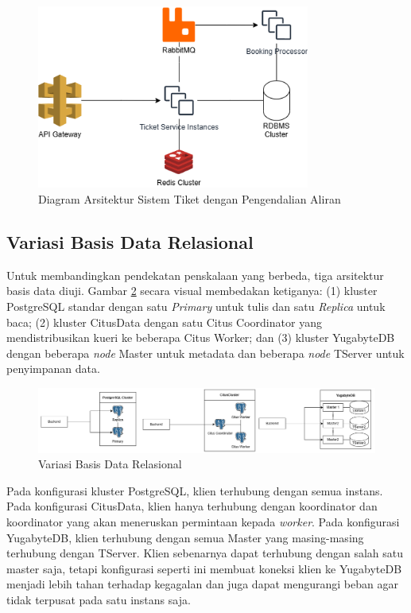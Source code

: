 \begin{figure}[H]
    \centering
    \includegraphics[width=0.8\textwidth]{resources/chapter-3/ticket-fc.png}
    \caption{Diagram Arsitektur Sistem Tiket dengan Pengendalian Aliran}
    \label{fig:ticket-fc}
\end{figure}

\subsection{Variasi Basis Data Relasional}

Untuk membandingkan pendekatan penskalaan yang berbeda, tiga arsitektur basis data diuji. Gambar \ref{fig:rdbms-variation} secara visual membedakan ketiganya: (1) kluster PostgreSQL standar dengan satu \textit{Primary} untuk tulis dan satu \textit{Replica} untuk baca; (2) kluster CitusData dengan satu Citus Coordinator yang mendistribusikan kueri ke beberapa Citus Worker; dan (3) kluster YugabyteDB dengan beberapa \textit{node} Master untuk metadata dan beberapa \textit{node} TServer untuk penyimpanan data.

\begin{figure}[H]
    \centering
    \includegraphics[width=1\textwidth]{resources/chapter-3/rdbms.png}
    \caption{Variasi Basis Data Relasional}
    \label{fig:rdbms-variation}
\end{figure}

Pada konfigurasi kluster PostgreSQL, klien terhubung dengan semua instans. Pada konfigurasi CitusData, klien hanya terhubung dengan koordinator dan koordinator yang akan meneruskan permintaan kepada \textit{worker}. Pada konfigurasi YugabyteDB, klien terhubung dengan semua Master yang masing-masing terhubung dengan TServer. Klien sebenarnya dapat terhubung dengan salah satu master saja, tetapi konfigurasi seperti ini membuat koneksi klien ke YugabyteDB menjadi lebih tahan terhadap kegagalan dan juga dapat mengurangi beban agar tidak terpusat pada satu instans saja.

